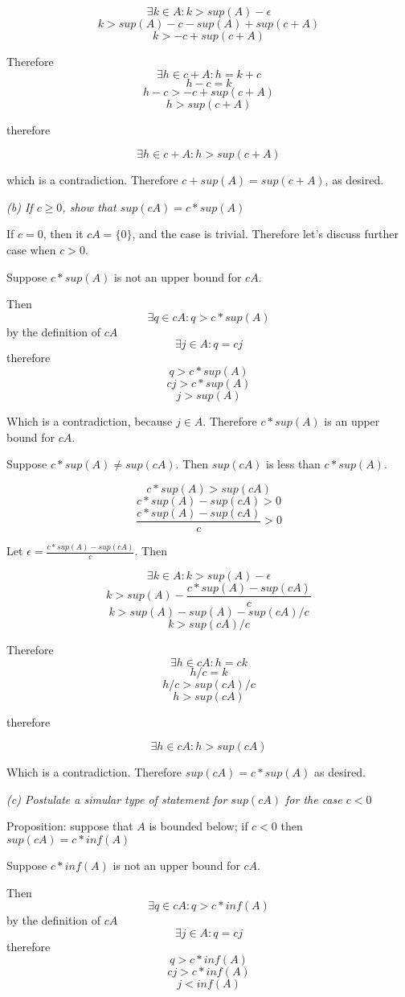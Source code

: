 \documentclass[11pt,oneside,titlepage]{article}
\begin{document}
$$\exists k \in A: k > sup(A) - \epsilon$$
$$k > sup(A) - c - sup(A) + sup(c + A)$$
$$k > - c  + sup(c + A)$$

Therefore
$$\exists h \in c + A: h = k + c$$
$$h - c = k$$
$$h - c >  -c + sup(c + A)$$
$$h > sup(c + A)$$

therefore

$$\exists h \in c + A: h > sup(c + A)$$

which is a contradiction. Therefore $c + sup(A) = sup(c + A)$, as desired.

\textit{(b) If $c \geq 0$, show that $sup(cA) = c * sup(A)$}

If $c = 0$, then it $cA = \{0\}$, and the case is trivial. Therefore let's
discuss further case when $c > 0$.

Suppose $c * sup(A)$ is not an upper bound for $cA$.

Then
$$\exists q \in cA: q > c * sup(A)$$
by the definition of $cA$
$$\exists j \in A: q = cj$$
therefore
$$q > c * sup(A)$$
$$cj > c * sup(A)$$
$$j > sup(A)$$

Which is a contradiction, because $j \in A$. Therefore $c * sup(A)$ is an
upper bound for $cA$.

Suppose $c *sup(A) \neq sup(cA)$. Then $sup(c A)$ is less
than $c * sup(A)$.

$$c * sup(A) > sup(cA)$$
$$c * sup(A) - sup(cA) > 0$$
$$\frac{c * sup(A) - sup(cA)}{c} > 0$$

Let $\epsilon = \frac{c * sup(A) - sup(cA)}{c}$. Then


$$\exists k \in A: k > sup(A) - \epsilon$$
$$k > sup(A) - \frac{c * sup(A) - sup(cA)}{c}$$
$$k > sup(A) - sup(A) - sup(cA)/c$$
$$k > sup(cA)/c$$

Therefore
$$\exists h \in cA: h = ck$$
$$h/c = k$$
$$h/c>  sup(cA)/c$$
$$h > sup(cA)$$

therefore

$$\exists h \in cA: h > sup(cA)$$

Which is a contradiction. Therefore $sup(cA) = c * sup(A)$ as desired.

\textit{(c) Postulate a simular type of statement for $sup(cA)$ for the case
  $c < 0$}

Proposition: suppose that $A$ is bounded below;  if $c < 0$ then $sup(cA) = c
* inf(A)$

Suppose $c * inf(A)$ is not an upper bound for $cA$.

Then
$$\exists q \in cA: q > c * inf(A)$$
by the definition of $cA$
$$\exists j \in A: q = cj$$
therefore
$$q > c * inf(A)$$
$$cj > c * inf(A)$$
$$j < inf(A)$$
\end{document}
